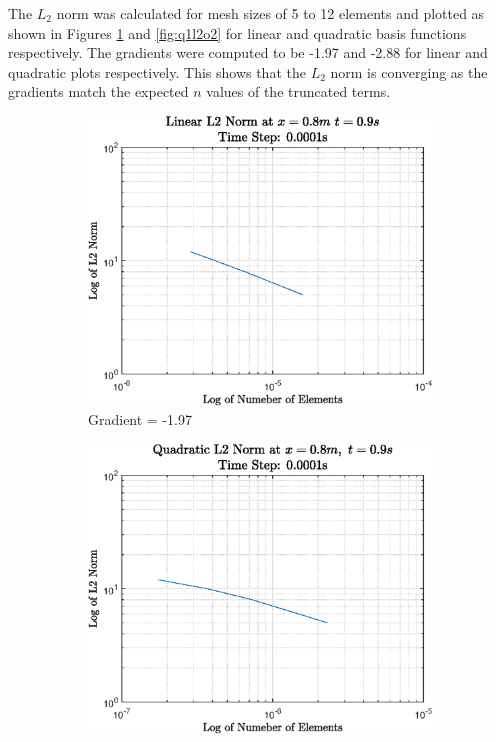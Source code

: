 \documentclass[11pt]{article}
\begin{document}
The $L_2$ norm was calculated for mesh sizes of 5 to 12 elements and plotted as shown in Figures \ref{fig:q1l2o1} and \ref{fig:q1l2o2} for linear and quadratic basis functions respectively. The gradients were computed to be -1.97 and -2.88 for linear and quadratic plots respectively. This shows that the $L_2$ norm is converging as the gradients match the expected $n$ values of the truncated terms. 


\begin{figure}[ht] 
        \centering
        \begin{subfigure}[b]{0.475\textwidth}
            \centering
            \includegraphics[width=\textwidth]{epsQ1L2O1}
            \caption[]%
            {{\small Gradient = -1.97 }}    
            \label{fig:q1l2o1}
        \end{subfigure}
        \hfill
        \begin{subfigure}[b]{0.475\textwidth}  
            \centering 
            \includegraphics[width=\textwidth]{epsQ1L2O2}

\end{subfigure}
\end{figure}
\end{document}
